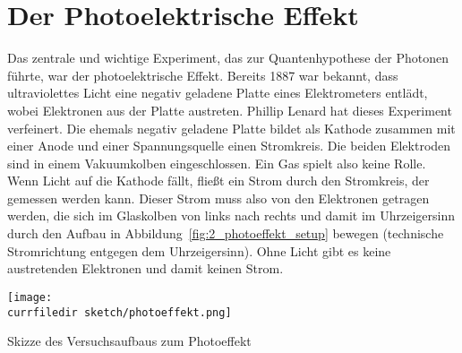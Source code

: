 


\section{Der Photoelektrische Effekt}

Das zentrale und wichtige Experiment, das zur Quantenhypothese der Photonen führte, war der photoelektrische Effekt. Bereits 1887 war bekannt, dass ultraviolettes Licht eine negativ geladene Platte eines Elektrometers entlädt, wobei Elektronen aus der Platte austreten. Phillip Lenard hat dieses Experiment verfeinert. Die ehemals negativ geladene Platte bildet als Kathode zusammen mit einer Anode und einer Spannungsquelle einen Stromkreis. Die beiden Elektroden sind in einem Vakuumkolben eingeschlossen. Ein Gas spielt also keine Rolle. Wenn Licht auf die Kathode fällt, fließt ein Strom durch den Stromkreis, der gemessen werden kann. Dieser Strom muss also von den Elektronen getragen werden, die sich im Glaskolben von links nach rechts und damit im Uhrzeigersinn durch den Aufbau in Abbildung~\ref{fig:2_photoeffekt_setup} bewegen
(technische Stromrichtung entgegen dem Uhrzeigersinn). Ohne Licht gibt es keine austretenden Elektronen und damit keinen Strom.

\begin{marginfigure}
    \texttt{[image: \\currfiledir sketch/photoeffekt.png]}
    \caption{Skizze des Versuchsaufbaus zum Photoeffekt}
    \label{fig:2_photoeffekt_setup}
\end{marginfigure}


